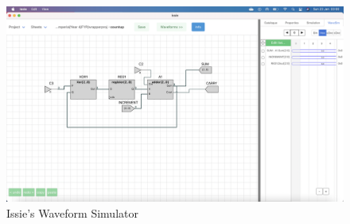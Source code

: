 \begin{figure} [h]
    \centering
    \includegraphics[width=\textwidth]{Appendices/IssieWaveSim.png}
    \caption{Issie's Waveform Simulator}
    \label{fig:IssieWS}
\end{figure}

